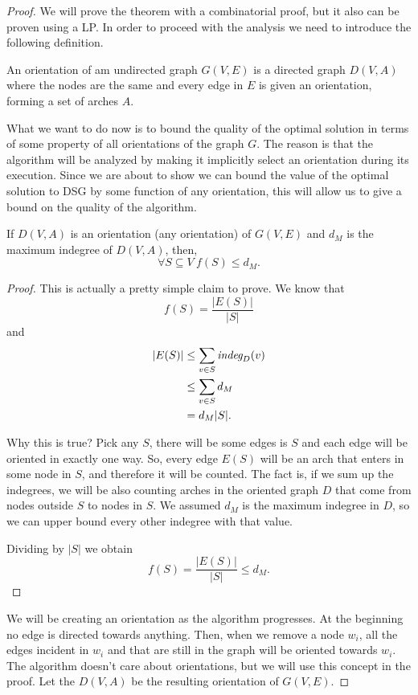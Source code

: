 \begin{proof}
We will prove the theorem with a combinatorial proof, but it also can be proven using a LP. In order to proceed with the analysis we need to introduce the following definition. 

\begin{defn}
	An orientation of am undirected graph $G(V, E)$ is a directed graph $D(V, A)$ where the nodes are the same and every edge in $E$ is given an orientation, forming a set of arches $A$.
\end{defn}

What we want to do now is to bound the quality of the optimal solution in terms of some property of all orientations of the graph $G$. The reason is that the algorithm will be analyzed by making it implicitly select an orientation during its execution. Since we are about to show we can bound the value of the optimal solution to DSG by some function of any orientation, this will allow us to give a bound on the quality of the algorithm.
\begin{lem}\label{lem:dsg_indeg_lower}
	If $D(V, A)$ is an orientation (any orientation) of $G(V,E)$ and $d_M$ is the maximum indegree of $D(V, A)$, then,
	\begin{equation}
		\forall S\subseteq V\ f(S) \leq d_M.
	\end{equation}
\end{lem}
\begin{proof}
	This is actually a pretty simple claim to prove. We know that
	\begin{equation}
		f(S) = \frac{|E(S)|}{|S|}
	\end{equation}
	and
	\begin{align}
		|E(S)| &\leq \sum_{v \in S} \textit{indeg}_D(v)\\
		&\leq\sum_{v \in S}d_M\\
		& = d_M |S|.
	\end{align}
	
	Why this is true? Pick any $S$, there will be some edges is $S$ and each edge will be oriented in exactly one way. So, every edge $E(S)$ will be an arch that enters in some node in $S$, and therefore it will be counted. The fact is, if we sum up the indegrees, we will be also counting arches in the oriented graph $D$ that come from nodes outside $S$ to nodes in $S$. We assumed $d_M$ is the maximum indegree in $D$, so we can upper bound every other indegree with that value.
	
	Dividing by $|S|$ we obtain
	\begin{equation}
	f(S) = \frac{|E(S)|}{|S|} \leq d_M.
	\end{equation}
\end{proof}
We will be creating an orientation as the algorithm progresses. At the beginning no edge is directed towards anything. Then, when we remove a node $w_i$, all the edges incident in $w_i$ and that are still in the graph will be oriented towards $w_i$. The algorithm doesn't care about orientations, but we will use this concept in the proof. Let the $D(V,A)$ be the resulting orientation of $G(V,E)$.


\end{proof}
